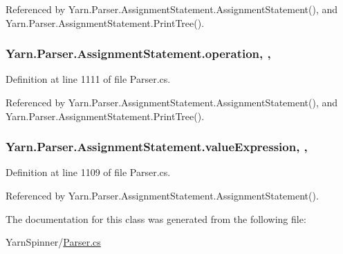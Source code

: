 Referenced by Yarn.\-Parser.\-Assignment\-Statement.\-Assignment\-Statement(), and Yarn.\-Parser.\-Assignment\-Statement.\-Print\-Tree().

\hypertarget{a00039_a896df0f23b44e9f20036150b3527d9e5}{
\subsubsection[{operation}]{ Yarn.\-Parser.\-Assignment\-Statement.\-operation\hspace{0.3cm}{\ttfamily [get]}, {\ttfamily [set]}, {\ttfamily [package]}}}\label{a00039_a896df0f23b44e9f20036150b3527d9e5}


Definition at line 1111 of file Parser.\-cs.



Referenced by Yarn.\-Parser.\-Assignment\-Statement.\-Assignment\-Statement(), and Yarn.\-Parser.\-Assignment\-Statement.\-Print\-Tree().

\hypertarget{a00039_a7ada366012cacd98436db80227ee65f5}{
\subsubsection[{value\-Expression}]{ Yarn.\-Parser.\-Assignment\-Statement.\-value\-Expression\hspace{0.3cm}{\ttfamily [get]}, {\ttfamily [set]}, {\ttfamily [package]}}}\label{a00039_a7ada366012cacd98436db80227ee65f5}


Definition at line 1109 of file Parser.\-cs.



Referenced by Yarn.\-Parser.\-Assignment\-Statement.\-Assignment\-Statement().



The documentation for this class was generated from the following file\-:\begin{DoxyCompactItemize}
\item 
Yarn\-Spinner/\hyperlink{a00313}{Parser.\-cs}\end{DoxyCompactItemize}

